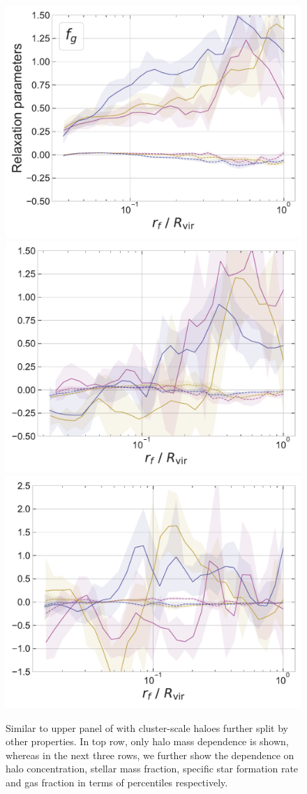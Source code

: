 \begin{figure}
    \includegraphics[width=0.32\linewidth]{plots/fit_params_rf_M-fg_T_13.pdf}
    \includegraphics[width=0.32\linewidth]{plots/fit_params_rf_M-fg_T_13.5.pdf}
    \includegraphics[width=0.32\linewidth]{plots/fit_params_rf_M-fg_T_14.pdf}
    
    \caption{Similar to upper panel of  with cluster-scale haloes further split by other properties. In top row, only halo mass dependence is shown, whereas in the next three rows, we further show the dependence on halo concentration, stellar mass fraction, specific star formation rate and gas fraction in terms of percentiles respectively.} 
    \label{fig:fit-func-rf-13514-ch:simbase}
\end{figure}

